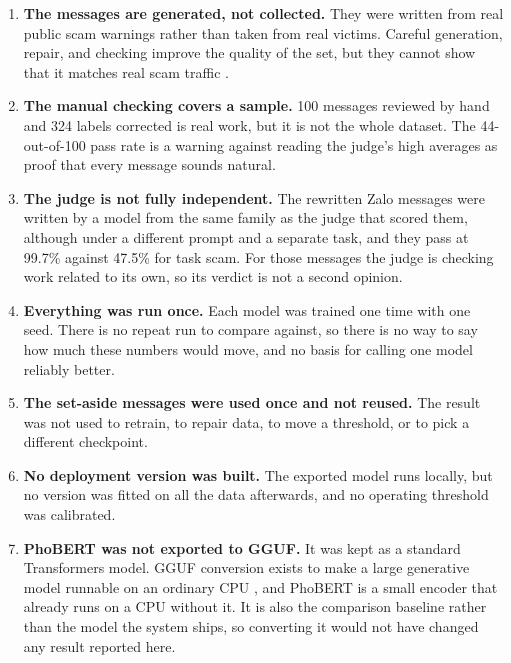 \begin{enumerate}
\item \textbf{The messages are generated, not collected.} They were written from real public scam warnings rather than taken from real victims. Careful generation, repair, and checking improve the quality of the set, but they cannot show that it matches real scam traffic \cite{kaddour2023synthetic}.

\item \textbf{The manual checking covers a sample.} 100 messages reviewed by hand and 324 labels corrected is real work, but it is not the whole dataset. The 44-out-of-100 pass rate is a warning against reading the judge's high averages as proof that every message sounds natural.

\item \textbf{The judge is not fully independent.} The rewritten Zalo messages were written by a model from the same family as the judge that scored them, although under a different prompt and a separate task, and they pass at 99.7\% against 47.5\% for task scam. For those messages the judge is checking work related to its own, so its verdict is not a second opinion.

\item \textbf{Everything was run once.} Each model was trained one time with one seed. There is no repeat run to compare against, so there is no way to say how much these numbers would move, and no basis for calling one model reliably better.

\item \textbf{The set-aside messages were used once and not reused.} The result was not used to retrain, to repair data, to move a threshold, or to pick a different checkpoint.

\item \textbf{No deployment version was built.} The exported model runs locally, but no version was fitted on all the data afterwards, and no operating threshold was calibrated.

\item \textbf{PhoBERT was not exported to GGUF.} It was kept as a standard Transformers model. GGUF conversion exists to make a large generative model runnable on an ordinary CPU \cite{kristiani2026deploying}, and PhoBERT is a small encoder that already runs on a CPU without it. It is also the comparison baseline rather than the model the system ships, so converting it would not have changed any result reported here.


\end{enumerate}
